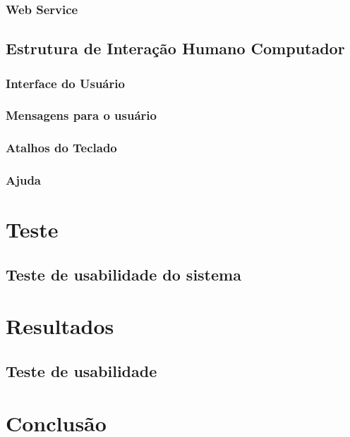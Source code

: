 \documentclass[
	12pt,				%
	openright,			%
	twoside,			%
	a4paper,			%
	english,			%
	brazil				%
	]{abntex2}
\begin{document}
		\subsection{Web Service}

	\section{Estrutura de Interação Humano Computador}

		\subsection{Interface do Usuário}
		\subsection{Mensagens para o usuário}
		\subsection{Atalhos do Teclado}
		\subsection{Ajuda}

\chapter{Teste}
\section{Teste de usabilidade do sistema}
\chapter{Resultados}
\section{Teste de usabilidade}
\chapter{Conclusão}

\lipsum[31-33]

\postextual


\end{document}
